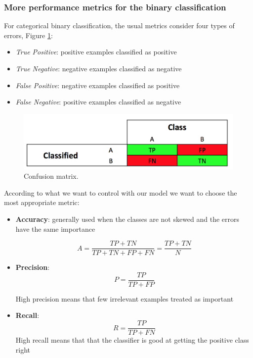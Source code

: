\subsubsection*{More performance metrics for the binary classification}

For categorical binary classification, the usual metrics consider four types of errors, Figure \ref{pic:confusion_matrix}:

\begin{itemize}
\item \emph{True Positive}: positive examples classified as positive
\item \emph{True Negative}: negative examples classified as negative
\item \emph{False Positive}: negative examples classified as positive
\item \emph{False Negative}: positive examples classified as negative
\end{itemize}

\begin{figure}[H]%
 \centering
 \includegraphics[width=13cm]{./img/08/confusion_matrix}
 \caption{\label{pic:confusion_matrix} Confusion matrix.}
\end{figure}

According to what we want to control with our model we want to choose the most appropriate metric:
\begin{itemize}
\item \textbf{Accuracy}: generally used when the classes are not skewed
and the errors have the same importance

$$A = \frac{TP+TN}{TP+TN+FP+FN} =  \frac{TP+TN}{N}$$

\item \textbf{Precision}: 
$$P = \frac{TP}{TP+FP}$$

High precision means that few irrelevant examples treated as important 
\item \textbf{Recall}: 
$$	R = \frac{TP}{TP+FN}$$
High recall means that that the classifier is good at getting the positive class right
\end{itemize}

